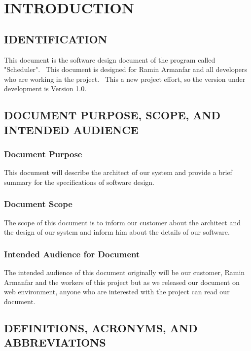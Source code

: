 \documentclass[twoside,letterpaper]{article}
\begin{document}
\bigskip

\bigskip
\clearpage\setcounter{page}{1}\pagestyle{Standard}
\section{INTRODUCTION}
\label{sec:intro}

\subsection{IDENTIFICATION}

This document is the software design document of the program called "Scheduler". \ This document is designed for Ramin Armanfar and all developers who are working in the project. \  This a new project effort, so the version under development is Version 1.0.

\subsection{DOCUMENT PURPOSE, SCOPE, AND INTENDED AUDIENCE}

\subsubsection{Document Purpose}

This document will describe the architect of our system and provide a brief summary for the specifications of software design.

\subsubsection{Document Scope}
The scope of this document is to inform our customer about the architect and the design of our system and inform him about the details of our software.

\subsubsection{Intended Audience for Document}

The intended audience of this document originally will be our customer, Ramin Armanfar and the workers of this project but as we released our document on web environment, anyone who are interested with the project can read our document.


\subsection{DEFINITIONS, ACRONYMS, AND ABBREVIATIONS}
\end{document}
